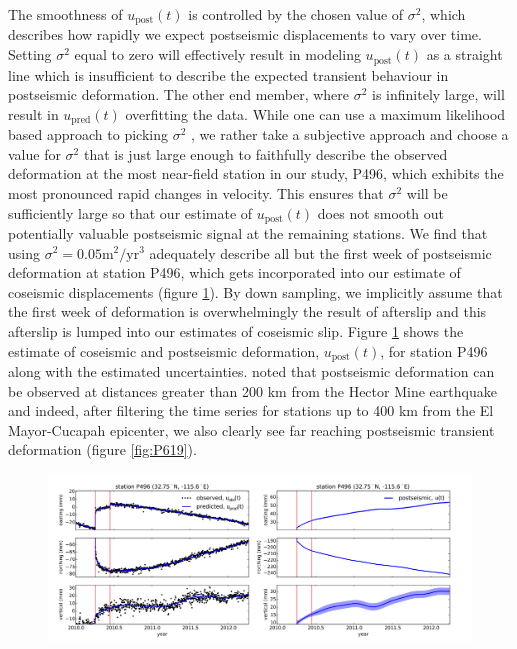 \documentclass[1p]{elsarticle}
\begin{document}
The smoothness of $u_\mathrm{post}(t)$ is controlled by the chosen value of $\sigma^2$, which describes how rapidly we expect postseismic displacements to vary over time.  Setting $\sigma^2$ equal to zero will effectively result in modeling $u_\mathrm{post}(t)$ as a straight line which is insufficient to describe the expected transient behaviour in postseismic deformation. The other end member, where $\sigma^2$ is infinitely large, will result in $u_\mathrm{pred}(t)$ overfitting the data. While one can use a maximum likelihood based approach to picking $\sigma^2$ \citep[e.g.][]{Segall1997}, we rather take a subjective approach and choose a value for $\sigma^2$ that is just large enough to faithfully describe the observed deformation at the most near-field station in our study, P496, which exhibits the most pronounced rapid changes in velocity. This ensures that $\sigma^2$ will be sufficiently large so that our estimate of $u_\mathrm{post}(t)$ does not smooth out potentially valuable postseismic signal at the remaining stations. We find that using $\sigma^2 = 0.05 \mathrm{m}^2 / \mathrm{yr}^3$ adequately describe all but the first week of postseismic deformation at station P496, which gets incorporated into our estimate of coseismic displacements (figure \ref{fig:P496}). By down sampling, we implicitly assume that the first week of deformation is overwhelmingly the result of afterslip and this afterslip is lumped into our estimates of coseismic slip.  Figure \ref{fig:P496} shows the estimate of coseismic and postseismic deformation, $u_\mathrm{post}(t)$, for station P496 along with the estimated uncertainties. \cite{Freed2007a} noted that postseismic deformation can be observed at distances greater than 200 km from the Hector Mine earthquake and indeed, after filtering the time series for stations up to 400 km from the El Mayor-Cucapah epicenter, we also clearly see far reaching postseismic transient deformation (figure \ref{fig:P619}).      

\begin{figure}
\includegraphics[scale=0.37]{Figures/filterP496}
\centering
\caption{}
\label{fig:P496}
\end{figure}
\end{document}
